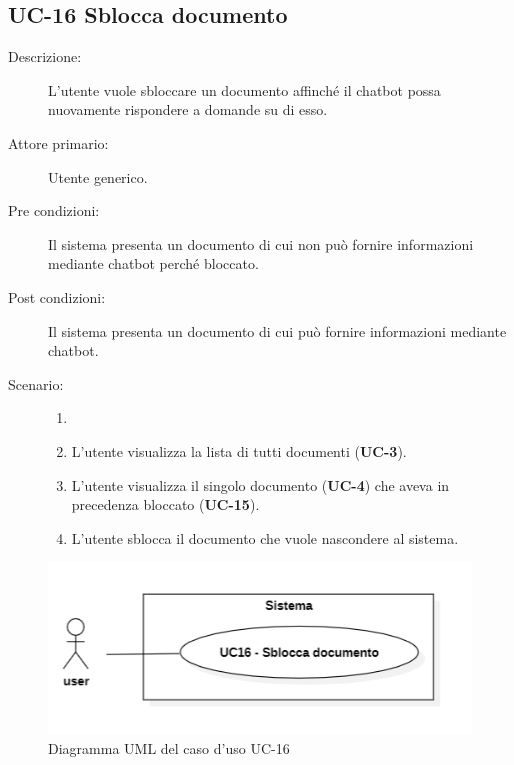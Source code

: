 \subsection{UC-16 Sblocca documento}
\begin{description}
    \item[Descrizione:] L'utente vuole sbloccare un documento affinché il chatbot possa nuovamente rispondere a domande su di esso.
    \item[Attore primario:] Utente generico.
    \item[Pre condizioni:] Il sistema presenta un documento di cui non può fornire informazioni mediante chatbot perché bloccato.
    \item[Post condizioni:] Il sistema presenta un documento di cui può fornire informazioni mediante chatbot.
    \newpage
    \item[Scenario:]
    \begin{enumerate}
        \item[]
        \item L’utente visualizza la lista di tutti documenti (\textbf{UC-3}).
        \item L'utente visualizza il singolo documento  (\textbf{UC-4}) che aveva in precedenza bloccato (\textbf{UC-15}).
        \item L'utente sblocca il documento che vuole nascondere al sistema.
    \end{enumerate}
\end{description}

\begin{figure}[H]
    \centering
    \includegraphics[width=0.8\linewidth]{UC16.PNG}
    \caption{Diagramma UML del caso d'uso UC-16}
\end{figure}

